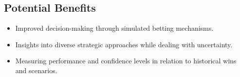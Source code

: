 \subsection{Potential Benefits}
\begin{itemize}
    \item Improved decision-making through simulated betting mechanisms.
    \item Insights into diverse strategic approaches while dealing with uncertainty.
    \item Measuring performance and confidence levels in relation to historical wins and scenarios.
\end{itemize}

\cite{agent1}
\cite{agent2}
\cite{agent3}